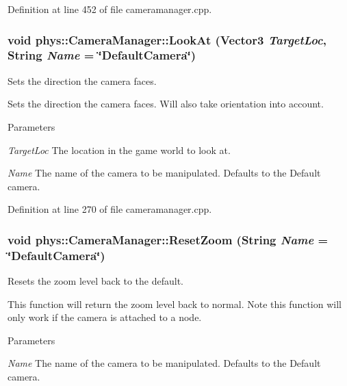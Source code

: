 Definition at line 452 of file cameramanager.cpp.

\hypertarget{classphys_1_1CameraManager_a885a499a53c3543b6bf429583a2cb54c}{
\subsubsection[{LookAt}]{\setlength{\rightskip}{0pt plus 5cm}void phys::CameraManager::LookAt ({\bf Vector3} {\em TargetLoc}, \/  {\bf String} {\em Name} = {\ttfamily \char`\"{}DefaultCamera\char`\"{}})}}
\label{d9/d91/classphys_1_1CameraManager_a885a499a53c3543b6bf429583a2cb54c}


Sets the direction the camera faces. 

Sets the direction the camera faces. Will also take orientation into account. 
\begin{DoxyParams}{Parameters}
\item[{\em TargetLoc}]The location in the game world to look at. \item[{\em Name}]The name of the camera to be manipulated. Defaults to the Default camera. \end{DoxyParams}


Definition at line 270 of file cameramanager.cpp.

\hypertarget{classphys_1_1CameraManager_a1cfaf4720fa9af7c0f234d6a2f26e179}{
\subsubsection[{ResetZoom}]{\setlength{\rightskip}{0pt plus 5cm}void phys::CameraManager::ResetZoom ({\bf String} {\em Name} = {\ttfamily \char`\"{}DefaultCamera\char`\"{}})}}
\label{d9/d91/classphys_1_1CameraManager_a1cfaf4720fa9af7c0f234d6a2f26e179}


Resets the zoom level back to the default. 

This function will return the zoom level back to normal. Note this function will only work if the camera is attached to a node. 
\begin{DoxyParams}{Parameters}
\item[{\em Name}]The name of the camera to be manipulated. Defaults to the Default camera. \end{DoxyParams}


